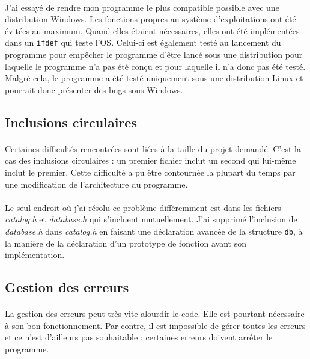 \documentclass{article}
\begin{document}
    \paragraph{}
    J'ai essayé de rendre mon programme le plus compatible possible avec une distribution Windows. Les fonctions propres au système d'exploitations ont été évitées au maximum. Quand elles étaient nécessaires, elles ont été implémentées dans un \texttt{ifdef} qui teste l'OS. Celui-ci est également testé au lancement du programme pour empêcher le programme d'être lancé sous une distribution pour laquelle le programme n'a pas été conçu et pour laquelle il n'a donc pas été testé. Malgré cela, le programme a été testé uniquement sous une distribution Linux et pourrait donc présenter des bugs sous Windows.


    \subsection{Inclusions circulaires}
    \paragraph{}
    Certaines difficultés rencontrées sont liées à la taille du projet demandé. C'est la cas des inclusions circulaires : un premier fichier inclut un second qui lui-même inclut le premier. Cette difficulté a pu être contournée la plupart du temps par une modification de l'architecture du programme.
    
    \paragraph{}
    Le seul endroit où j'ai résolu ce problème différemment est dans les fichiers \emph{catalog.h} et \emph{database.h} qui s'incluent mutuellement. J'ai supprimé l'inclusion de \emph{database.h} dans \emph{catalog.h} en faisant une déclaration avancée de la structure \texttt{db}, à la manière de la déclaration d'un prototype de fonction avant son implémentation.


    \subsection{Gestion des erreurs}
    \paragraph{}
    La gestion des erreurs peut très vite alourdir le code. Elle est pourtant nécessaire à son bon fonctionnement. Par contre, il est impossible de gérer toutes les erreurs et ce n'est d'ailleurs pas souhaitable : certaines erreurs doivent arrêter le programme.
\end{document}
